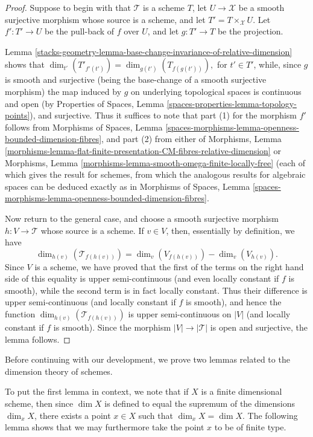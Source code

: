 \begin{proof}
Suppose to begin with that $\mathcal{T}$ is a scheme $T$,
let $U \to \mathcal{X}$ be a smooth surjective morphism whose source
is a scheme, and let $T' = T \times_{\mathcal{X}} U$.
Let $f': T' \to U$ be the pull-back of $f$ over $U$,
and let $g: T' \to T$ be the projection.

\medskip\noindent
Lemma \ref{stacks-geometry-lemma-base-change-invariance-of-relative-dimension}
shows that $\dim_{t'}(T'_{f'(t')}) = \dim_{g(t')}(T_{f(g(t'))}),$
for $t' \in T'$, while,
since $g$ is smooth and surjective (being the base-change
of a smooth surjective morphism) the map induced by $g$ on underlying
topological spaces is continuous and open
(by
Properties of Spaces, Lemma \ref{spaces-properties-lemma-topology-points}), and
surjective. Thus it suffices to note that part (1) for the morphism $f'$
follows from
Morphisms of Spaces, Lemma
\ref{spaces-morphisms-lemma-openness-bounded-dimension-fibres}, and part (2)
from either of Morphisms, Lemma
\ref{morphisms-lemma-flat-finite-presentation-CM-fibres-relative-dimension}
or
Morphisms, Lemma \ref{morphisms-lemma-smooth-omega-finite-locally-free}
(each of which gives the result for schemes, from which
the analogous results for algebraic spaces can
be deduced exactly as in
Morphisms of Spaces, Lemma
\ref{spaces-morphisms-lemma-openness-bounded-dimension-fibres}.

\medskip\noindent
Now return to the general case,
and choose a smooth surjective morphism
$h:V \to \mathcal{T}$ whose source is a scheme.
If $v \in V$, then, essentially by definition,
we have
$$
\dim_{h(v)}(\mathcal{T}_{f(h(v))}) =
\dim_{v}(V_{f(h(v))}) - \dim_{v}(V_{h(v)}).
$$
Since $V$ is a scheme, we have proved that the first
of the terms on the right hand side of this equality
is upper semi-continuous (and even locally
constant if $f$ is smooth), while the second term is
in fact locally constant.
Thus their difference is upper semi-continuous
(and locally constant if $f$ is smooth),
and hence the function
$\dim_{h(v)}(\mathcal{T}_{f(h(v))})$
is upper semi-continuous on $|V|$ (and locally
constant if $f$ is smooth).
Since the morphism $|V| \to |\mathcal{T}|$ is open and surjective,
the lemma follows.
\end{proof}

Before continuing with our development,
we prove two lemmas related to the dimension theory of schemes.

\medskip\noindent
To put the first lemma in context,
we note that if $X$ is a finite dimensional scheme, then since $\dim X$
is defined to equal the supremum of the dimensions $\dim_x X$,
there exists a point $x \in X$ such that $\dim_x X = \dim X$.
The following lemma shows that we may furthermore take the point
$x$ to be of finite type.

